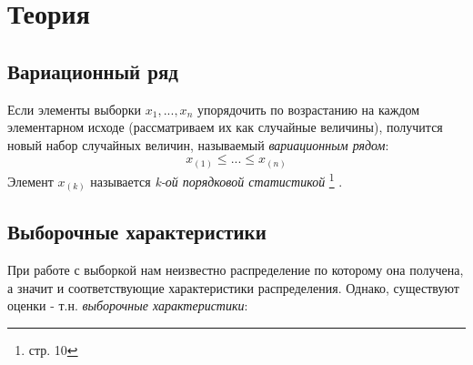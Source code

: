 \documentclass[12pt,a4paper]{article}
\begin{document}
\section{Теория}
\subsection{Вариационный ряд}
Если элементы выборки $x_1, ..., x_n$ упорядочить по возрастанию на каждом элементарном исходе (рассматриваем их как случайные величины), получится новый набор случайных величин, называемый \textit{вариационным рядом}:
$$x_{(1)} \leq ... \leq x_{(n)}$$ Элемент $x_{(k)}$ называется \textit{k-ой порядковой статистикой}
\footnote{\cite{chernova} стр. 10} .

\subsection{Выборочные характеристики}
При работе с выборкой нам неизвестно распределение по которому она получена, а значит и соответствующие характеристики распределения. Однако, существуют оценки - т.н. \textit{выборочные характеристики}:
\end{document}
